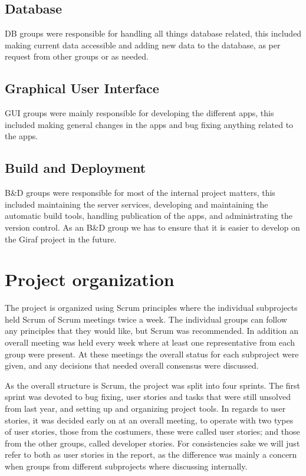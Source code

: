 \subsection{Database}
DB groups were responsible for handling all things database related, this included making current data accessible and adding new data to the database, as per request from other groups or as needed.

\subsection{Graphical User Interface}
GUI groups were mainly responsible for developing the different apps, this included making general changes in the apps and bug fixing anything related to the apps.

\subsection{Build and Deployment}
B\&D groups were responsible for most of the internal project matters, this included maintaining the server services, developing and maintaining the automatic build tools, handling publication of the apps, and administrating the version control. As an B\&D group we has to ensure that it is easier to develop on the Giraf project in the future.  


\section{Project organization}
The project is organized using Scrum principles where the individual subprojects held Scrum of Scrum meetings twice a week. The individual groups can follow any principles that they would like, but Scrum was recommended.
In addition an overall meeting was held every week where at least one representative from each group were present. At these meetings the overall status for each subproject were given, and any decisions that needed overall consensus were discussed.

As the overall structure is Scrum, the project was split into four sprints. The first sprint was devoted to bug fixing, user stories and tasks that were still unsolved from last year, and setting up and organizing project tools. In regards to user stories, it was decided early on at an overall meeting, to operate with two types of user stories, those from the costumers, these were called user stories; and those from the other groups, called developer stories. For consistencies sake we will just refer to both as user stories in the report, as the difference was mainly a concern when groups from different subprojects where discussing internally.

